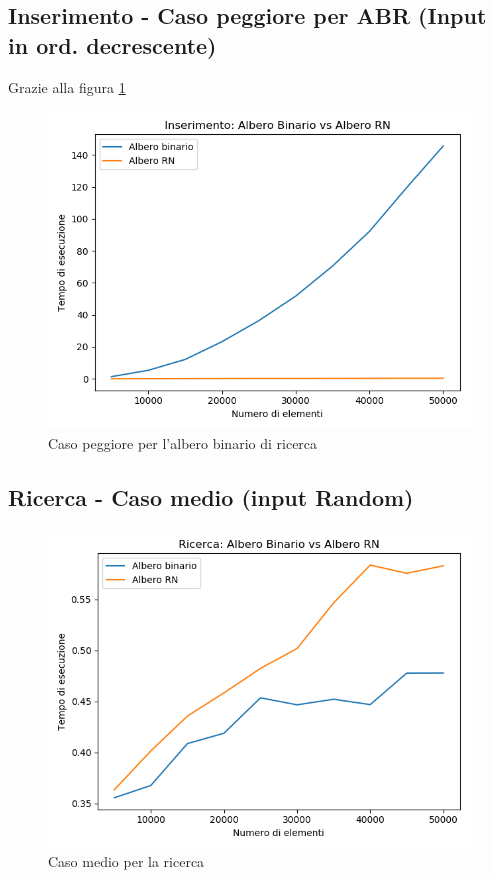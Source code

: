 \documentclass[a4paper]{article}
\begin{document}
\subsection{Inserimento - Caso peggiore per ABR (Input in ord. decrescente)}
Grazie alla figura \ref{fig:InsPeggioreAbr} 
 		\begin{figure}[!htb]
		\centering
		\includegraphics[scale=0.3]{Inserimentopeggiore}
		\caption{Caso peggiore per l'albero binario di ricerca}
		\label{fig:InsPeggioreAbr}
		\end{figure}
		
\subsection{Ricerca - Caso medio (input Random)}

		\begin{figure}[!htb]
		\centering
		\includegraphics[scale=0.3]{Ricercamedio}
		\caption{Caso medio per la ricerca}
		\label{fig:RicercaMedio}
		\end{figure}
		
\end{document}
